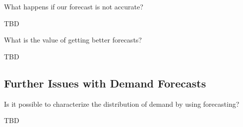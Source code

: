 \begin{question}
What happens if our forecast is not accurate?

  \begin{solution}
  TBD
  
%   
%
   
  \end{solution}
\end{question}

\begin{question}
What is the value of getting better forecasts?

  \begin{solution}
  TBD
%
    
  \end{solution}
\end{question}


\subsection{Further Issues with Demand Forecasts}

\begin{question}
Is it possible to characterize the distribution of demand by using forecasting?

  \begin{solution}
    TBD
    
  \end{solution}
\end{question}

